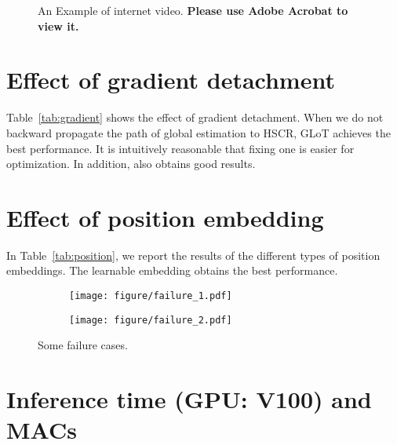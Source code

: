 \documentclass[10pt,twocolumn,letterpaper]{article}
\begin{document}
\begin{figure*}[!t]
    \centering
    \vspace{-0.5 em}
    \caption{An Example of internet video. \textbf{Please use Adobe Acrobat to view it.}}
    \vspace{-0.5 em}
    \label{fig:more_3}
\end{figure*}
\section{Effect of gradient detachment}
Table~\ref{tab:gradient} shows the effect of gradient detachment. 
When we do not backward propagate the path of global estimation to HSCR, GLoT achieves the best performance. It is intuitively reasonable that fixing one is easier for optimization. In addition,  also obtains good results. 

\section{Effect of position embedding}
In Table~\ref{tab:position}, we report the results of the different types of position embeddings. The learnable embedding obtains the best performance. 

\begin{figure}[!t]
		\begin{subfigure}{0.625\linewidth}
			\texttt{[image: figure/failure\_1.pdf]}
			\vspace{-1.5 em}
\label{fig:failure_1}
		\end{subfigure}
		\hfill
		\begin{subfigure}{0.335\linewidth}
			\texttt{[image: figure/failure\_2.pdf]}
			\vspace{-1.5 em}
\label{fig:failure_2}
		\end{subfigure}
		\vspace{-0.5 em}
		\caption{Some failure cases.}
		\vspace{-0.5 em}
		\label{fig:failure}
\end{figure}

\section{Inference time (GPU: V100) and MACs}
\end{document}
